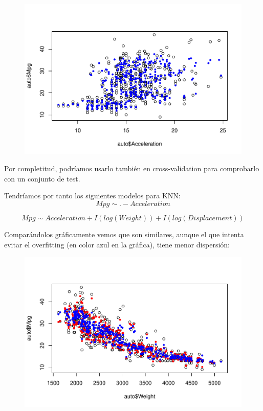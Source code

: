\begin{figure}[H]\includegraphics[width=.9\linewidth]{img/Regresion_files/figure-latex/unnamed-chunk-32-2} \caption{}\end{figure}

Por completitud, podríamos usarlo también en cross-validation para comprobarlo con un conjunto de test.

\vspace{\baselineskip}

Tendríamos por tanto los siguientes modelos para KNN: 
\begin{equation}
    Mpg \sim . - Acceleration 
\end{equation}

\begin{equation}    
    Mpg \sim Acceleration + I(log(Weight)) + I(log(Displacement))
\end{equation}

\vspace{\baselineskip}

Comparándolos gráficamente vemos que son similares, aunque el que intenta evitar el overfitting (en color azul en la gráfica), tiene menor dispersión:
\begin{figure}[H]\includegraphics[width=.9\linewidth]{img/Regresion_files/figure-latex/unnamed-chunk-33-1} \caption{}\end{figure}

